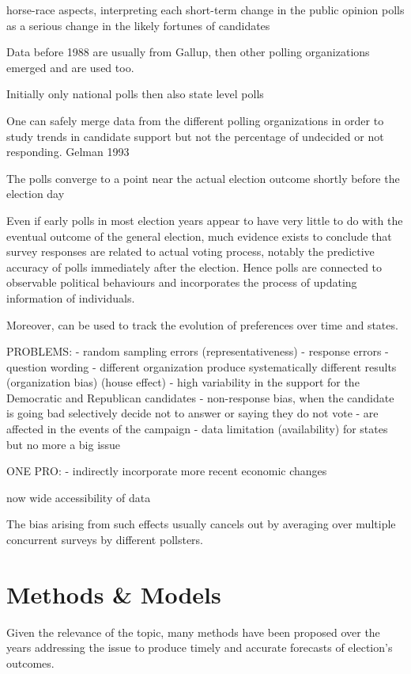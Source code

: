 \documentclass[
  12pt]{article}
\begin{document}
horse-race aspects, interpreting each short-term change in the public
opinion polls as a serious change in the likely fortunes of candidates

Data before 1988 are usually from Gallup, then other polling
organizations emerged and are used too.

Initially only national polls then also state level polls

One can safely merge data from the different polling organizations in
order to study trends in candidate support but not the percentage of
undecided or not responding. Gelman 1993

The polls converge to a point near the actual election outcome shortly
before the election day

Even if early polls in most election years appear to have very little to
do with the eventual outcome of the general election, much evidence
exists to conclude that survey responses are related to actual voting
process, notably the predictive accuracy of polls immediately after the
election. Hence polls are connected to observable political behaviours
and incorporates the process of updating information of individuals.

Moreover, can be used to track the evolution of preferences over time
and states.

PROBLEMS: - random sampling errors (representativeness) - response
errors - question wording - different organization produce
systematically different results (organization bias) (house effect) -
high variability in the support for the Democratic and Republican
candidates - non-response bias, when the candidate is going bad
selectively decide not to answer or saying they do not vote - are
affected in the events of the campaign - data limitation (availability)
for states but no more a big issue

ONE PRO: - indirectly incorporate more recent economic changes

now wide accessibility of data

The bias arising from such effects usually cancels out by averaging over
multiple concurrent surveys by different pollsters.

\hypertarget{methods-models}{%
\section{Methods \& Models}\label{methods-models}}

Given the relevance of the topic, many methods have been proposed over
the years addressing the issue to produce timely and accurate forecasts
of election's outcomes.
\end{document}
